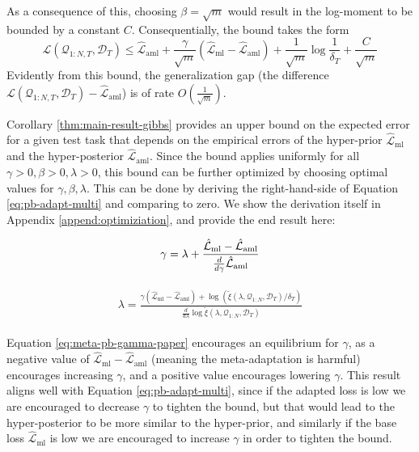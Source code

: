 \documentclass{article}
\theoremstyle{definition}
\begin{document}
As a consequence of this, choosing $\beta=\sqrt{m}$ would result 
in the log-moment to be bounded by a constant $C$. Consequentially, the bound takes the form
$$\mathcal{L}(\mathcal{Q}_{1:N,T}, \mathcal{D}_T) \leq \hat{\mathcal{L}}_{\mathrm{aml}} +
\frac{\gamma}{\sqrt{m}}(\hat{\mathcal{L}}_{\mathrm{ml}}-\hat{\mathcal{L}}_{\mathrm{aml}}) 
+\frac{1}{\sqrt{m}}\log\frac{1}{\delta_T}+\frac{C}{\sqrt{m}}$$
Evidently from this bound, the generalization gap (the difference $\mathcal{L}(\mathcal{Q}_{1:N,T}, \mathcal{D}_T)-\hat{\mathcal{L}}_{\mathrm{aml}}$) is of rate $O\left (\frac{1}{\sqrt{m}}\right )$.


Corollary \ref{thm:main-result-gibbs} provides an upper bound on the expected error for a given test task that depends on the empirical errors of the hyper-prior $\hat{\mathcal{L}}_{\mathrm{ml}}$ and the hyper-posterior $\hat{\mathcal{L}}_{\mathrm{aml}}$. 
Since the bound applies uniformly for all $\gamma>0,\beta>0,\lambda>0$, this bound can be further optimized by choosing optimal values for $\gamma, \beta, \lambda$. This can be done by deriving the right-hand-side of Equation \ref{eq:pb-adapt-multi} and comparing to zero. 
We show the derivation itself in Appendix \ref{append:optimiziation}, and provide the end result here:

\begin{align} \label{eq:meta-pb-gamma-paper}
\begin{split}
\gamma = \lambda+\frac{\hat{\mathcal{L}}_{\mathrm{ml}}-\hat{\mathcal{L}}_{\mathrm{aml}}}{\frac{d}{d\gamma}\hat{\mathcal{L}}_{\mathrm{aml}}}
\end{split}\hfill
\end{align}

\begin{align} \label{eq:meta-pb-lambda-paper}
\begin{split}
\lambda = \frac{\gamma(\hat{\mathcal{L}}_{\mathrm{ml}}-\hat{\mathcal{L}}_{\mathrm{aml}})+\log\left (\tilde{\xi}(\lambda,\mathcal{Q}_{1:N},\mathcal{D}_T)/\delta_T\right )}{\frac{d}{d\lambda}\log\tilde{\xi}(\lambda,\mathcal{Q}_{1:N},\mathcal{D}_T)}
\end{split}
\end{align}

Equation \ref{eq:meta-pb-gamma-paper} encourages an equilibrium for $\gamma$, as a negative value of $\hat{\mathcal{L}}_{\mathrm{ml}}-\hat{\mathcal{L}}_{\mathrm{aml}}$ (meaning the meta-adaptation is harmful) encourages increasing $\gamma$, and a positive value encourages lowering $\gamma$.
This result aligns well with Equation \ref{eq:pb-adapt-multi}, since if the adapted loss is low we are encouraged to decrease $\gamma$ to tighten the bound, but that would lead to the hyper-posterior to be more similar to the hyper-prior, and similarly if the base loss $\hat{\mathcal{L}}_{\mathrm{ml}}$ is low we are encouraged to increase $\gamma$ in order to tighten the bound.
\end{document}

